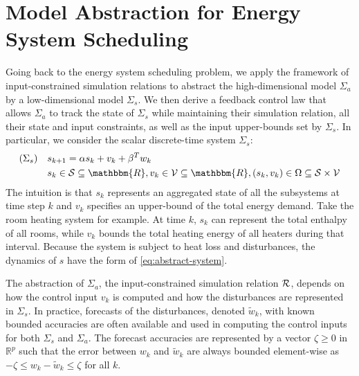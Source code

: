 \section{Model Abstraction for Energy System Scheduling}%
\label{sec:abstraction-gs}

Going back to the %
energy system scheduling problem, we apply the framework of input-constrained simulation relations to abstract the high-dimensional model $\Sigma_{a}$ by a low-dimensional model $\Sigma_{s}$.
We then derive a feedback control law that allows $\Sigma_{a}$ to track the state of $\Sigma_{s}$ while maintaining their simulation relation, all their state and input constraints, as well as the input upper-bounds set by $\Sigma_{s}$.
In particular, we consider the scalar discrete-time system $\Sigma_{s}$:
\begin{align}
  (\Sigma_s) \quad
  & s_{k + 1} = \alpha s_k + v_k + \beta^T w_{k}   \label{eq:abstract-system} \\
  & s_k \in \SSet \subseteq \mathbbm{R},
  v_k \in \VSet \subseteq \mathbbm{R},
  (s_k, v_k) \in \Omega \subseteq \SSet \times \VSet \nonumber
 \end{align}
%
The intuition is that $s_{k}$ represents an aggregated state of all the subsystems at time step $k$ and $v_{k}$ specifies an upper-bound of the total energy demand.
Take the room heating system for example.
At time $k$, $s_{k}$ can represent the total enthalpy of all rooms, while $v_{k}$ bounds the total heating energy of all heaters during that interval.
Because the system is subject to heat loss and disturbances, the dynamics of $s$ have the form of \eqref{eq:abstract-system}.

The abstraction of $\Sigma_{a}$, \ie the input-constrained simulation relation $\mathcal{R}$, depends on how the control input $v_{k}$ is computed and how the disturbances are represented in $\Sigma_{s}$.
In practice, forecasts of the disturbances, denoted $\tilde{w}_{k}$, with known bounded accuracies are often available and used in computing the control inputs for both $\Sigma_{s}$ and $\Sigma_{a}$.
The forecast accuracies are represented by a vector $\zeta \geq 0$ in $\mathbb{R}^{p}$ such that the error between $w_{k}$ and $\tilde{w}_{k}$ are always bounded element-wise as $-\zeta \leqslant w_{k} - \tilde{w}_{k} \leqslant \zeta$ for all $k$.

